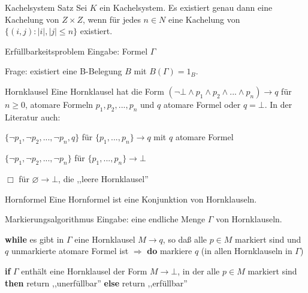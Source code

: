 \documentclass[avery5371]{flashcards}
\begin{document}
\begin{flashcard}[ Kompaktheitsatzes ]{ Kachelsystem Satz }
    Sei $K$ ein Kachelsystem. Es existiert genau dann eine Kachelung von $Z\times Z$, wenn für jedes $n\in N$ eine Kachelung von $\{(i,j) :|i|,|j| \leq n\}$ existiert.
\end{flashcard}

\begin{flashcard}[ Erfüllbarkeit ]{ Erfüllbarkeitsproblem }
    Eingabe: Formel $\Gamma$

    Frage: existiert eine B-Belegung $B$ mit $B(\Gamma) = 1_B$.
\end{flashcard}

\begin{flashcard}[ Erfüllbarkeit ]{ Hornklausel }
    Eine Hornklausel hat die Form $(\lnot\bot\wedge p_1\wedge p_2\wedge ... \wedge p_n)\rightarrow q$ für $n\geq 0$, atomare Formeln $p_1 ,p_2 ,... ,p_n$ und $q$ atomare Formel oder $q=\bot$. In der Literatur auch:
    \begin{itemize*}
        \item $\{\lnot p_1,\lnot p_2 ,... ,\lnot p_n,q\}$ für $\{p_1 ,... ,p_n\}\rightarrow q$ mit $q$ atomare Formel
        \item $\{\lnot p_1,\lnot p_2 ,... ,\lnot p_n\}$ für $\{p_1 ,... ,p_n\}\rightarrow\bot$
        \item $\Box$ für $\varnothing\rightarrow\bot$, die ,,leere Hornklausel''
    \end{itemize*}
\end{flashcard}

\begin{flashcard}[ Erfüllbarkeit ]{ Hornformel }
    Eine Hornformel ist eine Konjunktion von Hornklauseln.
\end{flashcard}

\begin{flashcard}[ Erfüllbarkeit ]{ Markierungsalgorithmus }
    Eingabe: eine endliche Menge $\Gamma$ von Hornklauseln.
    \begin{enumerate*}
        \item \textbf{while} es gibt in $\Gamma$ eine Hornklausel $M\rightarrow q$, so daß alle $p\in M$ markiert sind und $q$ unmarkierte atomare Formel ist $\Rightarrow$ \textbf{do} markiere $q$ (in allen Hornklauseln in $\Gamma$)
        \item \textbf{if} $\Gamma$ enthält eine Hornklausel der Form $M\rightarrow\bot$, in der alle $p\in M$ markiert sind
        \textbf{then} return ,,unerfüllbar''
        \textbf{else} return ,,erfüllbar''
    \end{enumerate*}
\end{flashcard}
\end{document}
